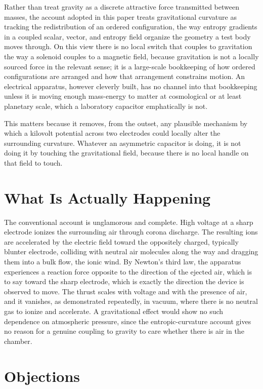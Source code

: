 \documentclass[11pt]{article}
\begin{document}
Rather than treat gravity as a discrete attractive force transmitted between masses, the account adopted in this paper treats gravitational curvature as tracking the redistribution of an ordered configuration, the way entropy gradients in a coupled scalar, vector, and entropy field organize the geometry a test body moves through. On this view there is no local switch that couples to gravitation the way a solenoid couples to a magnetic field, because gravitation is not a locally sourced force in the relevant sense; it is a large-scale bookkeeping of how ordered configurations are arranged and how that arrangement constrains motion. An electrical apparatus, however cleverly built, has no channel into that bookkeeping unless it is moving enough mass-energy to matter at cosmological or at least planetary scale, which a laboratory capacitor emphatically is not.

This matters because it removes, from the outset, any plausible mechanism by which a kilovolt potential across two electrodes could locally alter the surrounding curvature. Whatever an asymmetric capacitor is doing, it is not doing it by touching the gravitational field, because there is no local handle on that field to touch.

\section{What Is Actually Happening}

The conventional account is unglamorous and complete. High voltage at a sharp electrode ionizes the surrounding air through corona discharge. The resulting ions are accelerated by the electric field toward the oppositely charged, typically blunter electrode, colliding with neutral air molecules along the way and dragging them into a bulk flow, the ionic wind. By Newton's third law, the apparatus experiences a reaction force opposite to the direction of the ejected air, which is to say toward the sharp electrode, which is exactly the direction the device is observed to move. The thrust scales with voltage and with the presence of air, and it vanishes, as demonstrated repeatedly, in vacuum, where there is no neutral gas to ionize and accelerate. A gravitational effect would show no such dependence on atmospheric pressure, since the entropic-curvature account gives no reason for a genuine coupling to gravity to care whether there is air in the chamber.

\section{Objections}
\end{document}
